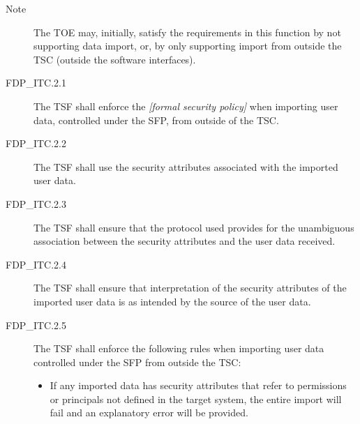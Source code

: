 \documentclass[12pt,english]{scrbook}
\begin{document}
\begin{description}
\item[Note]

The TOE may, initially, satisfy the requirements in this
function by not supporting data import, or, by only
supporting import from outside the TSC (outside the
software interfaces).

\item[FDP{\_}ITC.2.1]

The TSF shall enforce the \emph{{[}formal security policy]} when importing user 
data, controlled under the SFP, from outside of the TSC.

\item[FDP{\_}ITC.2.2 ]

The TSF shall use the security attributes associated with the imported 
user data.

\item[FDP{\_}ITC.2.3]

The TSF shall ensure that the protocol used provides for the unambiguous 
association between the security attributes and the user data received.

\item[FDP{\_}ITC.2.4]

The TSF shall ensure that interpretation of the security attributes of 
the imported user data is as intended by the source of the user data.

\item[FDP{\_}ITC.2.5]

The TSF shall enforce the following rules when importing user data 
controlled under the SFP from outside the TSC:
\begin{itemize}
\item {} 
If any imported data has security attributes that refer to
permissions or principals not defined in the target system, the
entire import will fail and an explanatory error will be provided.

\end{itemize}

\end{description}
\end{document}
